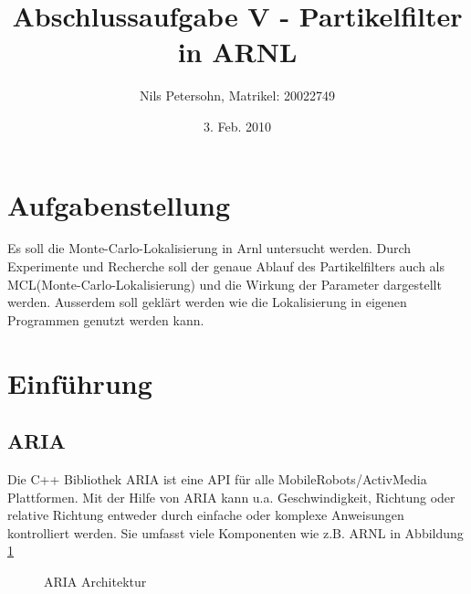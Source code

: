 \documentclass{article}
\title{Abschlussaufgabe V - Partikelfilter in ARNL}
\author{Nils Petersohn, Matrikel: 20022749}
\date{3. Feb. 2010}
\begin{document}
\maketitle

\tableofcontents
\listoftables

\section{Aufgabenstellung}
Es soll die Monte-Carlo-Lokalisierung in Arnl untersucht werden. Durch Experimente und Recherche soll der genaue Ablauf des Partikelfilters auch als MCL(Monte-Carlo-Lokalisierung) und die Wirkung der Parameter dargestellt werden. Ausserdem soll gekl\"art werden wie die Lokalisierung in eigenen Programmen genutzt werden kann.


\section{Einf\"uhrung}\label{einfuehrung}



\subsection{ARIA}
Die C++ Bibliothek ARIA ist eine API f\"ur alle MobileRobots/ActivMedia Plattformen. Mit der Hilfe von ARIA kann u.a. Geschwindigkeit, Richtung oder relative Richtung entweder durch einfache oder komplexe Anweisungen kontrolliert werden. Sie umfasst viele Komponenten wie z.B. ARNL in Abbildung \ref{ariaarch}
\begin{figure}
  \centering
  \caption{ARIA Architektur}
  \label{ariaarch}
\end{figure}
\end{document}
